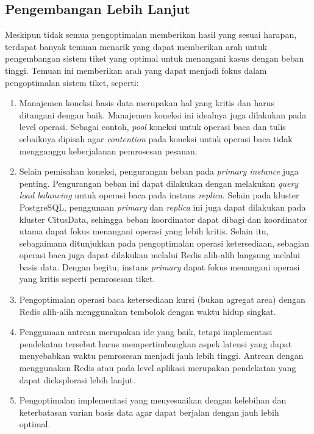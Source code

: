 \pagebreak

\subsection{Pengembangan Lebih Lanjut}
\label{pengembangan-lebih-lanjut}

Meskipun tidak semua pengoptimalan memberikan hasil yang sesuai harapan, terdapat banyak temuan menarik yang dapat memberikan arah untuk pengembangan sistem tiket yang optimal untuk menangani kasus dengan beban tinggi. Temuan ini memberikan arah yang dapat menjadi fokus dalam pengoptimalan sistem tiket, seperti:

\begin{enumerate}
    \item Manajemen koneksi basis data merupakan hal yang kritis dan harus ditangani dengan baik. Manajemen koneksi ini idealnya juga dilakukan pada level operasi. Sebagai contoh, \textit{pool} koneksi untuk operasi baca dan tulis sebaiknya dipisah agar \textit{contention} pada koneksi untuk operasi baca tidak mengganggu keberjalanan pemrosesan pesanan.
    \item Selain pemisahan koneksi, pengurangan beban pada \textit{primary instance} juga penting. Pengurangan beban ini dapat dilakukan dengan melakukan \textit{query load balancing} untuk operasi baca pada instans \textit{replica}. Selain pada kluster PostgreSQL, penggunaan \textit{primary} dan \textit{replica} ini juga dapat dilakukan pada kluster CitusData, sehingga beban koordinator dapat dibagi dan koordinator utama dapat fokus menangani operasi yang lebih kritis. Selain itu, sebagaimana ditunjukkan pada pengoptimalan operasi ketersediaan, sebagian operasi baca juga dapat dilakukan melalui Redis alih-alih langsung melalui basis data. Dengan begitu, instans \textit{primary} dapat fokus menangani operasi yang kritis seperti pemrosesan tiket.
    \item Pengoptimalan operasi baca ketersediaan kursi (bukan agregat area) dengan Redis alih-alih menggunakan tembolok dengan waktu hidup singkat.
    \item Penggunaan antrean merupakan ide yang baik, tetapi implementasi pendekatan tersebut harus mempertimbangkan aspek latensi yang dapat menyebabkan waktu pemrosesan menjadi jauh lebih tinggi. Antrean dengan menggunakan Redis atau pada level aplikasi merupakan pendekatan yang dapat dieksplorasi lebih lanjut.
    \item Pengoptimalan implementasi yang menyesuaikan dengan kelebihan dan keterbatasan varian basis data agar dapat berjalan dengan jauh lebih optimal.
\end{enumerate}

